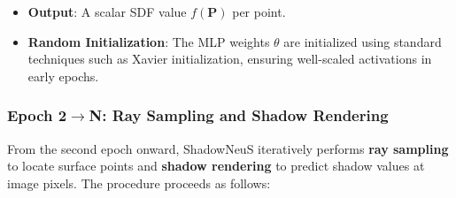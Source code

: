 \documentclass[12pt,a4paper]{article}
\theoremstyle{definition}
\newtheorem{remark}{Remark}[subsection]
\begin{document}
\begin{itemize}
    \begin{remark}[Why Positional Encoding?] ~\\
    Raw coordinates $\mathbf{P} = (p_x, p_y, p_z)$ do not provide sufficient high-frequency variation for MLPs, leading to overly smooth approximations (spectral bias). Positional encoding introduces Fourier feature mappings \hyperlink{[TSS20]}{[TSS20]}, allowing the network to represent both coarse and fine geometric structures revealed by shadows.
    \end{remark}

    \item \textbf{Output}: A scalar SDF value $f(\mathbf{P})$ per point.

    \item \textbf{Random Initialization}: The MLP weights $\theta$ are initialized using standard techniques such as Xavier initialization, ensuring well-scaled activations in early epochs.
\end{itemize}

\subsubsection{Epoch 2$\to$N: Ray Sampling and Shadow Rendering} \label{sec:epoch2_ray_sampling}

From the second epoch onward, ShadowNeuS iteratively performs \textbf{ray sampling} to locate surface points and \textbf{shadow rendering} to predict shadow values at image pixels. The procedure proceeds as follows:
\end{document}
